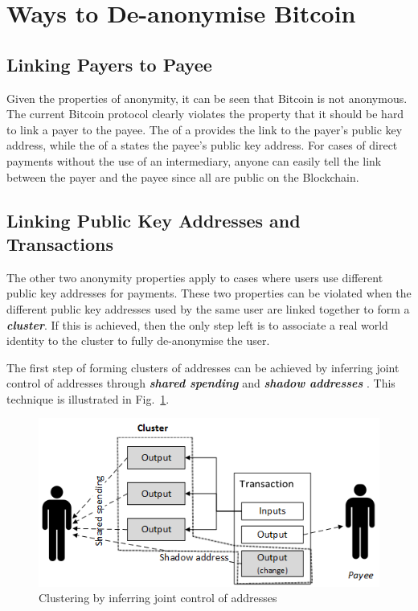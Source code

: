 \section{Ways to De-anonymise Bitcoin}
\label{sec:1-Ways to De-anonymise Bitcoin}
\subsection{Linking Payers to Payee}
\label{sec:1-Linking Payers to Payee}
Given the properties of anonymity, it can be seen that Bitcoin is not anonymous. The current Bitcoin protocol clearly violates the property that it should be hard to link a payer to the payee. The \kwInput{} of a \kwTransaction{}{} provides the link to the payer’s public key address, while the \kwOutput{} of a \kwTransaction{}{} states the payee’s public key address. For cases of direct payments without the use of an intermediary, anyone can easily tell the link between the payer and the payee since all  are public on the Blockchain. 

\subsection{Linking Public Key Addresses and Transactions}
\label{sec:1-Linking Public Key Addresses and Transactions}
The other two anonymity properties apply to cases where users use different public key addresses for payments. These two properties can be violated when the different public key addresses used by the same user are linked together to form a \textbf{\textit{cluster}}. If this is achieved, then the only step left is to associate a real world identity to the cluster to fully de-anonymise the user. 

The first step of forming clusters of addresses can be achieved by inferring joint control of addresses through \textbf{\textit{shared spending}} and \textbf{\textit{shadow addresses}} \cite{Androulaki2013}. This technique is illustrated in Fig.~\ref{fig:bitcoin_cluster}.

\begin{figure}[H]
	\begin{center}
		\includegraphics[scale=0.9]{bitcoin-cluster} 
		\caption{Clustering by inferring joint control of addresses}
		\label{fig:bitcoin_cluster} 
	\end{center}
\end{figure}

